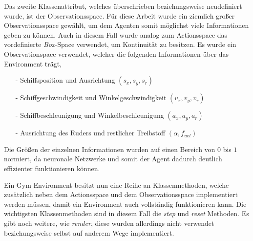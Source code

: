 \documentclass[]{iat}
\begin{document}
Das zweite Klassenattribut, welches überschrieben beziehungsweise neudefiniert wurde, ist der Observationsspace. Für diese Arbeit wurde ein ziemlich großer Observationsspace gewählt, um dem Agenten somit möglichst viele Informationen geben zu können. Auch in diesem Fall wurde analog zum Actionsspace das vordefinierte \textit{Box}-Space verwendet, um Kontinuität zu besitzen. Es wurde ein Observationspace verwendet, welcher die folgenden Informationen über das Environment trägt,
\begin{enumerate}
    \item[-] Schiffsposition und Ausrichtung $(s_x, s_y, s_r)$
    \item[-] Schiffgeschwindigkeit und Winkelgeschwindigkeit $(v_x, v_y, v_r)$
    \item[-] Schiffbeschleunigung und Winkelbeschleunigung $(a_x, a_y, a_r)$
    \item[-] Ausrichtung des Ruders und restlicher Treibstoff $(\alpha, f_{uel})$
\end{enumerate}
Die Größen der einzelnen Informationen wurden auf einen Bereich von $0$ bis $1$ normiert, da neuronale Netzwerke und somit der Agent dadurch deutlich effizienter funktionieren können. \cite[]{normalization_importance}

Ein Gym Environment besitzt nun eine Reihe an Klassenmethoden, welche zusätzlich neben dem Actionsspace und dem Observationsspace implementiert werden müssen, damit ein Environment auch vollständig funktionieren kann. Die wichtigsten Klassenmethoden sind in diesem Fall die \textit{step} und \textit{reset} Methoden. Es gibt noch weitere, wie \textit{render}, diese wurden allerdings nicht verwendet beziehungsweise selbst auf anderem Wege implementiert.
\end{document}

